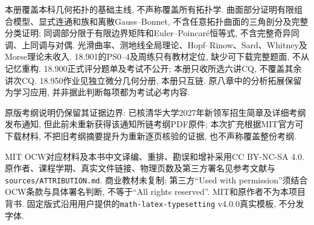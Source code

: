 本册覆盖本科几何拓扑的基础主线, 不声称覆盖所有拓扑学. 曲面部分证明有限组合模型、显式连通和族和离散Gauss--Bonnet, 不含任意拓扑曲面的三角剖分及完整分类证明; 同调部分限于有限边界矩阵和Euler--Poincar\'e恒等式, 不含完整奇异同调、上同调与对偶. 光滑曲率、测地线全局理论、Hopf--Rinow、Sard、Whitney及Morse理论未收入. 18.901的PS0--4及周练只有教材定位, 缺少可下载完整题面, 不从记忆重构. 18.900正式评分题单及考试不公开; 本册只收所选六讲CQ, 不覆盖其余讲次CQ. 18.950作业见独立微分几何分册, 本册只互链. 原八章中的分析拓展保留为学习应用, 并非据此判断每项都为考试必考内容.

原版考纲说明仍保留其证据边界: 已核清华大学2027年新领军招生简章及详细考纲发布通知, 但此前未重新获得该通知所链考纲PDF原件; 本次扩充根据MIT官方可下载材料, 不把旧考纲摘要提升为重新逐页核验的证据, 也不声称覆盖整份考纲.

MIT OCW对应材料及本书中文译编、重排、勘误和增补采用CC BY-NC-SA 4.0. 原作者、课程学期、真实文件链接、物理页数及第三方署名见参考文献与\texttt{sources/ATTRIBUTION.md}. 商业教材未复制; 第三方“Used with permission”须结合OCW条款与具体署名判断, 不等于“All rights reserved”. MIT和原作者不为本项目背书. 固定版式沿用用户提供的\texttt{math-latex-typesetting} v4.0.0真实模板, 不分发字体.
